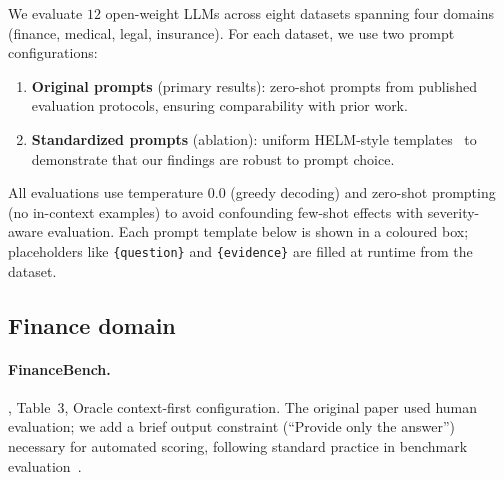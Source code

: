 
We evaluate $12$ open-weight LLMs across eight datasets spanning four
domains (finance, medical, legal, insurance). For each dataset, we use
two prompt configurations:
\begin{enumerate}
    \item \textbf{Original prompts} (primary results): zero-shot
      prompts from published evaluation protocols, ensuring
      comparability with prior work.
    \item \textbf{Standardized prompts} (ablation): uniform HELM-style
      templates~\cite{liang2023helm} to demonstrate that our findings
      are robust to prompt choice.
\end{enumerate}

All evaluations use temperature $0.0$ (greedy decoding) and zero-shot
prompting (no in-context examples) to avoid confounding few-shot
effects with severity-aware evaluation. Each prompt template below is
shown in a coloured box; placeholders like \texttt{\{question\}} and
\texttt{\{evidence\}} are filled at runtime from the dataset.

\subsection{Finance domain}

\paragraph{FinanceBench.}
\citet{islam2023financebench}, Table~3, Oracle context-first
configuration. The original paper used human evaluation; we add a
brief output constraint (\enquote{Provide only the answer}) necessary for
automated scoring, following standard practice in benchmark
evaluation~\cite{liang2023helm}.


